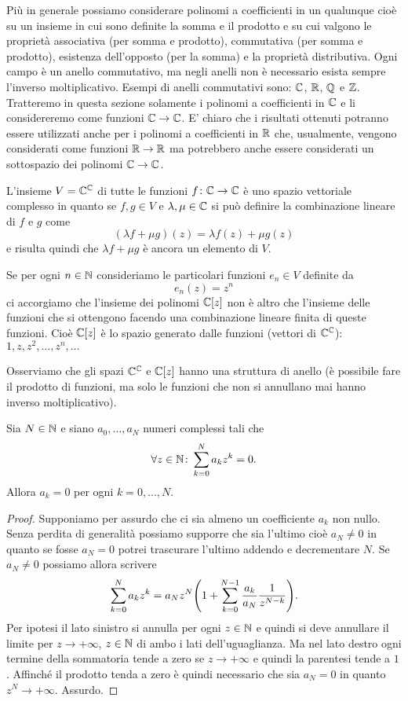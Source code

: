 Più in generale possiamo considerare polinomi a coefficienti in un qualunque 
cioè su un insieme in cui sono definite la somma e il prodotto e su cui valgono le proprietà associativa (per somma e prodotto), commutativa (per somma e prodotto), esistenza dell'opposto (per la somma) e la proprietà distributiva.
Ogni campo è un anello commutativo, ma negli anelli non è necessario esista sempre l'inverso moltiplicativo.
Esempi di anelli commutativi sono: $\mathbb C$, $\mathbb R$, $\mathbb Q$ e $\mathbb Z$.
Tratteremo in questa sezione solamente i polinomi a coefficienti in $\mathbb C$ e li considereremo come funzioni $\mathbb C \to \mathbb C$. E' chiaro che i risultati ottenuti potranno essere utilizzati anche per i polinomi a coefficienti in $\mathbb R$ che, usualmente, vengono considerati come funzioni $\mathbb R \to \mathbb R$ ma potrebbero anche essere considerati un sottospazio dei polinomi $\mathbb C \to \mathbb C$.

L'insieme $V = \mathbb C^\mathbb C$ di tutte le funzioni $f\colon \mathbb C \to\mathbb C$ è uno spazio vettoriale complesso in quanto se $f,g\in V$ e $\lambda, \mu \in \mathbb C$ si può definire la combinazione lineare di $f$ e $g$ come
\[
  (\lambda f+ \mu g)(z) = \lambda f(z) + \mu g(z)
\]
e risulta quindi che $\lambda f + \mu g$ è ancora un elemento di $V$.

Se per ogni $n\in \mathbb N$ consideriamo le particolari funzioni $e_n\in V$ definite da
\[
  e_n(z) = z^n
\]
ci accorgiamo che l'insieme dei polinomi $\mathbb C[z]$ non è altro
che l'insieme delle funzioni che si ottengono facendo una combinazione
lineare finita di queste funzioni. Cioè $\mathbb C[z]$ è lo spazio generato dalle funzioni (vettori di $\mathbb C^\mathbb C$): $1, z, z^2, \dots, z^n,\dots$

Osserviamo che gli spazi $\mathbb C^\mathbb C$ e $\mathbb C[z]$ hanno una struttura di anello (è possibile fare il prodotto di funzioni, ma solo le funzioni che non si annullano mai hanno inverso moltiplicativo).

\begin{theorem}
\label{th:annullamento_polinomi}
Sia $N \in \mathbb N$ e siano $a_0, \dots, a_N$ numeri complessi tali che
\[
\forall z \in \mathbb N \colon \sum_{k=0}^N a_k z^k = 0.
\]
Allora $a_k=0$ per ogni $k=0,\dots, N$.
\end{theorem}
%
\begin{proof}
Supponiamo per assurdo che ci sia almeno un coefficiente $a_k$ non nullo. Senza perdita di generalità possiamo supporre che sia l'ultimo cioè $a_N \neq 0$ in quanto se fosse $a_N=0$ potrei trascurare l'ultimo addendo e decrementare $N$.
Se $a_N\neq 0$ possiamo allora scrivere
\[
 \sum_{k=0}^N a_k z^k = a_N z^N {\left(  1 + \sum_{k=0}^{N-1} \frac{a_k}{a_N}\frac{1}{z^{N-k}} \right)}.
\]
Per ipotesi il lato sinistro si annulla per ogni $z\in \mathbb N$ e quindi si deve annullare il limite per $z\to +\infty$, $z \in \mathbb N$ di ambo i lati dell'uguaglianza. Ma nel lato destro ogni termine della sommatoria
tende a zero se $z \to +\infty$ e quindi la parentesi tende a $1$. Affinché il prodotto tenda a zero è quindi necessario che sia $a_N = 0$ in quanto $z^N \to +\infty$. Assurdo.
\end{proof}

